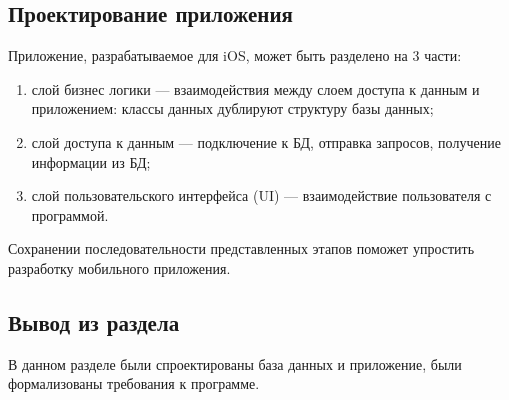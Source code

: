 \subsection{Проектирование приложения}

Приложение, разрабатываемое для iOS, может быть разделено на 3 части:
\begin{enumerate}
	\item слой бизнес логики --- взаимодействия между слоем доступа к данным и приложением: классы данных дублируют структуру базы данных;
	\item слой доступа к данным --- подключение к БД, отправка запросов, получение информации из БД;
	\item слой пользовательского интерфейса (UI) --- взаимодействие пользователя с программой.
\end{enumerate}

Сохранении последовательности представленных этапов поможет упростить разработку мобильного приложения.

\subsection{Вывод из раздела}

В данном разделе были спроектированы база данных и приложение, были формализованы требования к программе.
